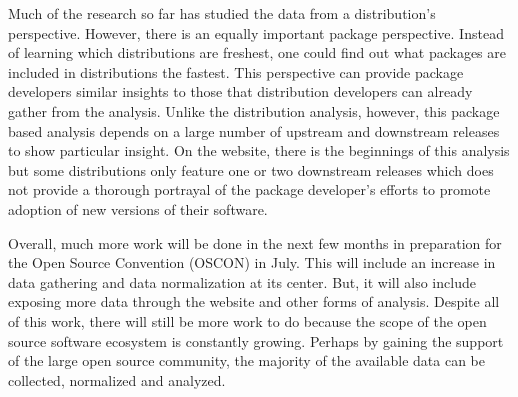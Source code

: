 \documentclass[letterpaper,10pt]{article}
\begin{document}
Much of the research so far has studied the data from a distribution's perspective.  However, there is an equally important package perspective.  Instead of learning which distributions are freshest, one could find out what packages are included in distributions the fastest.  This perspective can provide package developers similar insights to those that distribution developers can already gather from the analysis.  Unlike the distribution analysis, however, this package based analysis depends on a large number of upstream and downstream releases to show particular insight.  On the website, there is the beginnings of this analysis but some distributions only feature one or two downstream releases which does not provide a thorough portrayal of the package developer's efforts to promote adoption of new versions of their software.

Overall, much more work will be done in the next few months in preparation for the Open Source Convention (OSCON) in July.  This will include an increase in data gathering and data normalization at its center.  But, it will also include exposing more data through the website and other forms of analysis.  Despite all of this work, there will still be more work to do because the scope of the open source software ecosystem is constantly growing.  Perhaps by gaining the support of the large open source community, the majority of the available data can be collected, normalized and analyzed.
\end{document}
